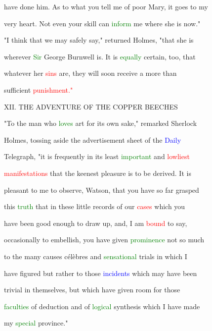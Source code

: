  have done him. As to what you tell me of poor Mary, it goes to my

 very heart. Not even your skill can \textcolor{green}{inform} me where she is now."



 "I think that we may safely say," returned Holmes, "that she is

 wherever \textcolor{green}{Sir} George Burnwell is. It is \textcolor{green}{equally} certain, too, that

 whatever her \textcolor{red}{sins} are, they will soon receive a more than

 sufficient \textcolor{red}{punishment."}







 XII. THE \textcolor{BurntOrange}{ADVENTURE} OF THE COPPER BEECHES



 "To the man who \textcolor{green}{loves} \textcolor{BurntOrange}{art} for its own sake," remarked Sherlock

 Holmes, tossing aside the advertisement sheet of the \textcolor{blue}{Daily}

 Telegraph, "it is frequently in its least \textcolor{green}{important} and \textcolor{red}{lowliest}

 \textcolor{red}{manifestations} that the keenest pleasure is to be derived. It is

 \textcolor{BurntOrange}{pleasant} to me to observe, Watson, that you have so far grasped

 this \textcolor{green}{truth} that in these little records of our \textcolor{red}{cases} which you

 have been \textcolor{BurntOrange}{good} enough to draw up, and, I am \textcolor{red}{bound} to say,

 occasionally to embellish, you have given \textcolor{green}{prominence} not so much

 to the many causes célèbres and \textcolor{green}{sensational} trials in which I

 have figured but rather to those \textcolor{blue}{incidents} which may have been

 trivial in themselves, but which have given room for those

 \textcolor{green}{faculties} of deduction and of \textcolor{green}{logical} synthesis which I have made

 my \textcolor{green}{special} province."



